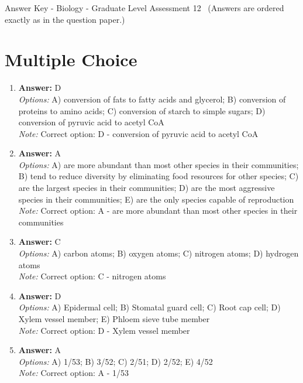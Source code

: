 \documentclass[12pt]{article}
\begin{document}
\begin{center}
Answer Key - Biology - Graduate Level Assessment 12 \
\small (Answers are ordered exactly as in the question paper.)
\end{center}

\section*{Multiple Choice}
\begin{enumerate}[label=\arabic*.]
\item \textbf{Answer:} D
\\ \textit{Options:} A) conversion of fats to fatty acids and glycerol; B) conversion of proteins to amino acids; C) conversion of starch to simple sugars; D) conversion of pyruvic acid to acetyl CoA
\\ \textit{Note:} Correct option: D - conversion of pyruvic acid to acetyl CoA
\item \textbf{Answer:} A
\\ \textit{Options:} A) are more abundant than most other species in their communities; B) tend to reduce diversity by eliminating food resources for other species; C) are the largest species in their communities; D) are the most aggressive species in their communities; E) are the only species capable of reproduction
\\ \textit{Note:} Correct option: A - are more abundant than most other species in their communities
\item \textbf{Answer:} C
\\ \textit{Options:} A) carbon atoms; B) oxygen atoms; C) nitrogen atoms; D) hydrogen atoms
\\ \textit{Note:} Correct option: C - nitrogen atoms
\item \textbf{Answer:} D
\\ \textit{Options:} A) Epidermal cell; B) Stomatal guard cell; C) Root cap cell; D) Xylem vessel member; E) Phloem sieve tube member
\\ \textit{Note:} Correct option: D - Xylem vessel member
\item \textbf{Answer:} A
\\ \textit{Options:} A) 1/53; B) 3/52; C) 2/51; D) 2/52; E) 4/52
\\ \textit{Note:} Correct option: A - 1/53
\end{enumerate}
\end{document}
